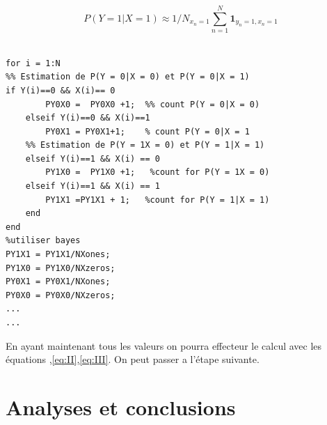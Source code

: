 \documentclass{report}
\begin{document}
\begin{equation}\label{key}
P(Y=1|X=1) \approx 1/N_{x_n=1} \sum_{n=1}^{N}  \mathbf{1}_{y_n=1,x_n=1} 
\end{equation}

\begin{lstlisting}[caption={Code },label=code_]

for i = 1:N
%% Estimation de P(Y = 0|X = 0) et P(Y = 0|X = 1) 
if Y(i)==0 && X(i)== 0
		PY0X0 =  PY0X0 +1;  %% count P(Y = 0|X = 0)
	elseif Y(i)==0 && X(i)==1
		PY0X1 = PY0X1+1;    % count P(Y = 0|X = 1                  
	%% Estimation de P(Y = 1X = 0) et P(Y = 1|X = 1) 
	elseif Y(i)==1 && X(i) == 0  
		PY1X0 =  PY1X0 +1;   %count for P(Y = 1X = 0)
	elseif Y(i)==1 && X(i) == 1
		PY1X1 =PY1X1 + 1;   %count for P(Y = 1|X = 1) 
	end
end
%utiliser bayes
PY1X1 = PY1X1/NXones;
PY1X0 = PY1X0/NXzeros;
PY0X1 = PY0X1/NXones; 
PY0X0 = PY0X0/NXzeros;
...
...
\end{lstlisting}

En ayant maintenant tous les valeurs on pourra effecteur le calcul avec les équations 
,\ref{eq:II},\ref{eq:III}. On peut passer a l'étape suivante.
%
%



\chapter{Analyses et conclusions}
\end{document}
